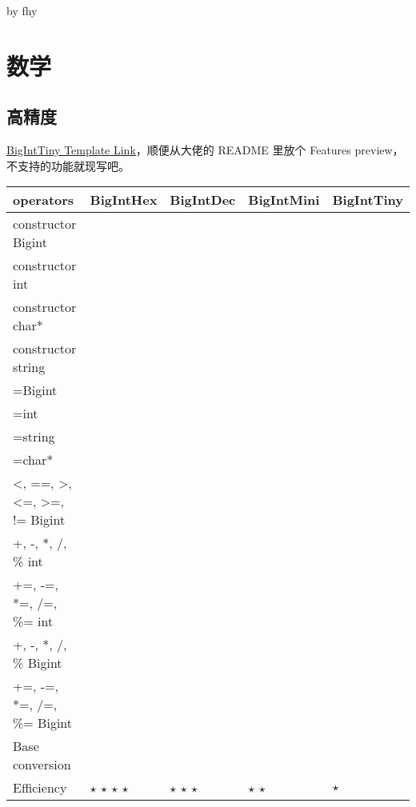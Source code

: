 \documentclass[12pt]{article}
\newcommand{\cmark}{\text{\color{ForestGreen}\ding{51}}}%
\newcommand{\xmark}{\text{\color{red}\ding{55}}}%
\begin{document}
by fhy



\newpage

{\centering\section{数学}}

\subsection{高精度}

\href{https://github.com/Baobaobear/MiniBigInteger/blob/main/bigint_tiny.h}{BigIntTiny Template Link}，顺便从大佬的 README 里放个 Features preview，不支持的功能就现写吧。

\begin{table}[!ht]
	\centering
	\begin{tabular}{|l|l|l|l|l|}
		\hline
		operators & BigIntHex & BigIntDec & BigIntMini & BigIntTiny \\ \hline
		constructor Bigint & \cmark & \cmark & \cmark & \cmark \\ \hline
		constructor int & \cmark & \cmark & \cmark & \cmark \\ \hline
		constructor char* & \cmark & \cmark & \xmark & \xmark \\ \hline
		constructor string & \cmark & \cmark & \cmark & \cmark \\ \hline
		=Bigint & \cmark & \cmark & \cmark & \cmark \\ \hline
		=int & \cmark & \cmark & \cmark & \cmark \\ \hline
		=string & \cmark & \cmark & \cmark & \cmark \\ \hline
		=char* & \cmark & \cmark & \cmark & \xmark \\ \hline
		<, ==, >, <=, >=, != Bigint & \cmark & \cmark & \cmark & \cmark \\ \hline
		+, -, *, /, \% int & \xmark & \xmark & \xmark & \cmark \\ \hline
		+=, -=, *=, /=, \%= int & \xmark & \xmark & \xmark & \xmark \\ \hline
		+, -, *, /, \% Bigint & \cmark & \cmark & \cmark & \cmark \\ \hline
		+=, -=, *=, /=, \%= Bigint & \cmark & \cmark & \xmark & \xmark \\ \hline
		Base conversion & \cmark & \cmark & \xmark & \xmark \\ \hline
		Efficiency & $\star$ $\star$ $\star$ $\star$ & $\star$ $\star$ $\star$ & $\star$ $\star$ & $\star$ \\ \hline
	\end{tabular}
\end{table}
\end{document}
